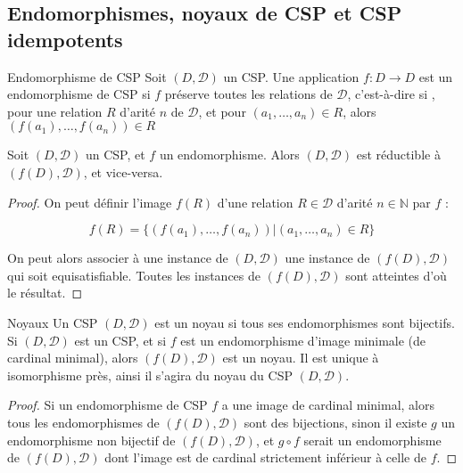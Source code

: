 \subsection{Endomorphismes, noyaux de CSP et CSP idempotents}

\begin{defi}{Endomorphisme de CSP}
    Soit $(D,\mathcal{D})$ un CSP. Une application $f : D \rightarrow D$ est un
    endomorphisme de CSP si $f$ préserve toutes les relations de $\mathcal{D}$,
    c'est-à-dire si , pour une relation $R$ d'arité $n$ de $\mathcal{D}$, et
    pour $(a_1,\dots,a_n) \in R$, alors $(f(a_1),\dots,f(a_n)) \in R$
\end{defi}

\begin{prop}
    Soit $(D,\mathcal{D})$ un CSP, et $f$ un endomorphisme. Alors $(D,\mathcal{D})$
    est réductible à $(f(D),\mathcal{D})$, et vice-versa.
\end{prop}

\begin{proof}
    On peut définir l'image $f(R)$ d'une relation $R \in \mathcal{D}$ d'arité $n
    \in \mathbb{N}$ par $f$ :

    $$ f(R) = \{ (f(a_1),\dots,f(a_n))| (a_1,\dots,a_n) \in R\}$$

    On peut alors associer à une instance de $(D,\mathcal{D})$ une instance de
    $(f(D),\mathcal{D})$ qui soit equisatisfiable. Toutes les instances de
    $(f(D),\mathcal{D})$ sont atteintes d'où le résultat.
\end{proof}

\begin{defi}{Noyaux}
    Un CSP $(D,\mathcal{D})$ est un noyau si tous ses endomorphismes sont
    bijectifs. Si $(D,\mathcal{D})$ est un CSP, et si $f$ est un endomorphisme
    d'image minimale (de cardinal minimal), alors $(f(D),\mathcal{D})$ est un
    noyau. Il est unique à isomorphisme près, ainsi il s'agira du noyau du CSP
    $(D,\mathcal{D})$.
\end{defi}

\begin{proof}
    Si un endomorphisme de CSP $f$ a une image de cardinal minimal, alors tous les
    endomorphismes de $(f(D),\mathcal{D})$ sont des bijections, sinon il existe
    $g$ un endomorphisme non bijectif de $(f(D),\mathcal{D})$, et $g \circ f$
    serait un endomorphisme de $(f(D),\mathcal{D})$ dont l'image est de
    cardinal strictement inférieur à celle de $f$.
\end{proof}

